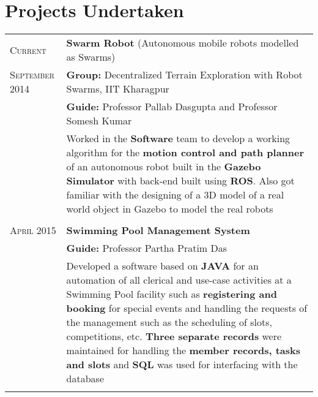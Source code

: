 \documentclass[a4paper,10pt]{extarticle} %
\begin{document}
\section{Projects Undertaken}

\begin{tabular}{R{3.0cm}|p{15.0cm}}
\textsc{Current} & \textbf{Swarm Robot} \textmd{(Autonomous mobile robots modelled as Swarms)} \\
\textsc{September 2014} & \textbf{Group: }\textmd{Decentralized Terrain Exploration with Robot Swarms}, IIT Kharagpur\\
& \textbf{Guide: }\textmd{Professor Pallab Dasgupta} and \textmd{Professor Somesh Kumar}\\
& \textmd{Worked in the \textbf{Software} team to develop a working algorithm for the \textbf{motion control and path planner} of an autonomous robot built in the \textbf{Gazebo Simulator} with back-end built using \textbf{ROS}. Also got familiar with the designing of a 3D model of a real world object in Gazebo to model the real robots}\\
 \\


\textsc{April 2015} & \textbf{Swimming Pool Management System}\\
& \textbf{Guide: }\textmd{Professor Partha Pratim Das}\\
& \textmd{Developed a software based on \textbf{JAVA} for an automation of all clerical and use-case activities at a Swimming Pool facility such as \textbf{registering and booking} for special events and handling the requests of the management such as the scheduling of slots, competitions, etc. \textbf{Three separate records} were maintained for handling the \textbf{member records, tasks and slots} and \textbf{SQL} was used for interfacing with the database}\\
 \\


\end{tabular}
\end{document}
